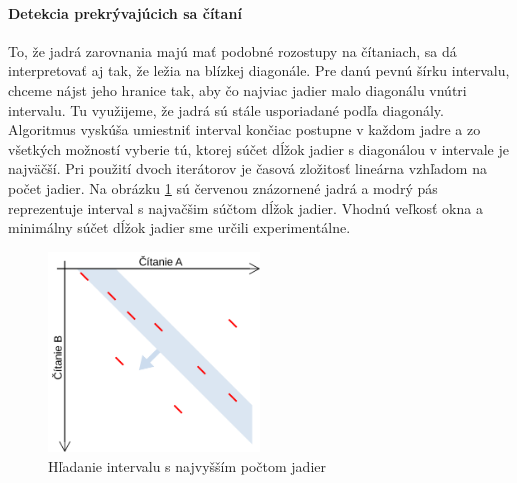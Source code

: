 \paragraph{Detekcia prekrývajúcich sa čítaní}

To, že jadrá zarovnania majú mať podobné rozostupy na čítaniach, sa dá interpretovať aj tak, že ležia na blízkej diagonále. Pre danú pevnú šírku intervalu, chceme nájst jeho hranice tak, aby čo najviac jadier malo diagonálu vnútri intervalu. Tu využijeme, že jadrá sú stále usporiadané podľa diagonály. Algoritmus vyskúša umiestniť interval končiac postupne v každom jadre a zo všetkých možností vyberie tú, ktorej súčet dĺžok jadier s diagonálou v intervale je najväčší. Pri použití dvoch iterátorov je časová zložitosť lineárna vzhľadom na počet jadier. Na obrázku \ref{fig:diagonalovy_interval} sú červenou znázornené jadrá a modrý pás reprezentuje interval s najvačšim súčtom dĺžok jadier. Vhodnú veľkosť okna a minimálny súčet dĺžok jadier sme určili experimentálne.

\begin{figure}
    \centering
    \includegraphics[width=0.5\textwidth]{images/diagonalovy_interval.png}
    \caption{Hľadanie intervalu s najvyšším počtom jadier}
    \label{fig:diagonalovy_interval}
\end{figure} 